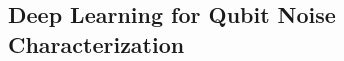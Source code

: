\subsection{Deep Learning for Qubit Noise Characterization}
\label{sec:wiseDeepLearn}

\cite{wise_using_2021}
